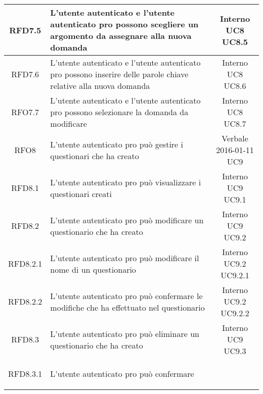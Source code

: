 \begin{longtable}{|c|>{\centering}m{7cm}|c|}
			 \hypertarget{{RFD7.5}}{{RFD7.5}} & L’utente autenticato e l’utente
autenticato pro possono scegliere un
argomento da assegnare alla nuova
domanda & \makecell{Interno\\ UC8 \\UC8.5 } \\ \hline
			 \hypertarget{{RFD7.6}}{{RFD7.6}} & L’utente autenticato e l’utente
autenticato pro possono inserire delle
parole chiave relative alla nuova domanda & \makecell{Interno\\ UC8 \\UC8.6 } \\ \hline
			 \hypertarget{{RFO7.7}}{{RFO7.7}} & L’utente autenticato e l’utente
autenticato pro possono selezionare la domanda da modificare & \makecell{Interno\\ UC8 \\UC8.7 } \\ \hline
			 \hypertarget{{RFO8}}{{RFO8}} & L’utente autenticato pro può gestire i
questionari che ha creato & \makecell{Verbale 2016-01-11\\ UC9 } \\ \hline
			 \hypertarget{{RFD8.1}}{{RFD8.1}} & L’utente autenticato pro può visualizzare
i questionari creati & \makecell{Interno\\ UC9 \\UC9.1 } \\ \hline
			 \hypertarget{{RFD8.2}}{{RFD8.2}} & L’utente autenticato pro può modificare
un questionario che ha creato & \makecell{Interno\\ UC9 \\UC9.2 } \\ \hline
			 \hypertarget{{RFD8.2.1}}{{RFD8.2.1}} & L’utente autenticato pro può modificare il
nome di un questionario & \makecell{Interno\\ UC9.2 \\UC9.2.1 } \\ \hline
			 \hypertarget{{RFD8.2.2}}{{RFD8.2.2}} & L’utente autenticato pro può confermare
le modifiche che ha effettuato nel
questionario & \makecell{Interno\\ UC9.2 \\UC9.2.2 } \\ \hline
			 \hypertarget{{RFD8.3}}{{RFD8.3}} & L’utente autenticato pro può eliminare
un questionario che ha creato & \makecell{Interno\\ UC9 \\UC9.3 } \\ \hline
			 \hypertarget{{RFD8.3.1}}{{RFD8.3.1}} & L’utente autenticato pro può confermare

\end{longtable}
